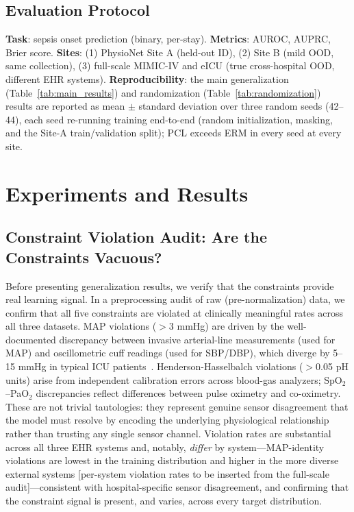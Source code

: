 \documentclass{article}
\begin{document}
\subsection{Evaluation Protocol}

\textbf{Task}: sepsis onset prediction (binary, per-stay). \textbf{Metrics}: AUROC, AUPRC, Brier score. \textbf{Sites}: (1) PhysioNet Site A (held-out ID), (2) Site B (mild OOD, same collection), (3) full-scale MIMIC-IV and eICU (true cross-hospital OOD, different EHR systems). \textbf{Reproducibility}: the main generalization (Table~\ref{tab:main_results}) and randomization (Table~\ref{tab:randomization}) results are reported as mean $\pm$ standard deviation over three random seeds (42--44), each seed re-running training end-to-end (random initialization, masking, and the Site-A train/validation split); PCL exceeds ERM in every seed at every site.

\section{Experiments and Results}
\label{sec:results}

\subsection{Constraint Violation Audit: Are the Constraints Vacuous?}
\label{sec:audit}

Before presenting generalization results, we verify that the constraints provide real learning signal.
In a preprocessing audit of raw (pre-normalization) data, we confirm that all five constraints are violated at clinically meaningful rates across all three datasets.
MAP violations ($>$3 mmHg) are driven by the well-documented discrepancy between invasive arterial-line measurements (used for MAP) and oscillometric cuff readings (used for SBP/DBP), which diverge by 5--15 mmHg in typical ICU patients~\citep{wax2011invasive}.
Henderson-Hasselbalch violations ($>$0.05 pH units) arise from independent calibration errors across blood-gas analyzers; SpO$_2$--PaO$_2$ discrepancies reflect differences between pulse oximetry and co-oximetry.
These are not trivial tautologies: they represent genuine sensor disagreement that the model must resolve by encoding the underlying physiological relationship rather than trusting any single sensor channel.
Violation rates are substantial across all three EHR systems and, notably, \emph{differ} by system---MAP-identity violations are lowest in the training distribution and higher in the more diverse external systems [per-system violation rates to be inserted from the full-scale audit]---consistent with hospital-specific sensor disagreement, and confirming that the constraint signal is present, and varies, across every target distribution.
\end{document}
